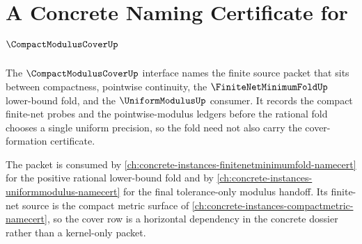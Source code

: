 \chapter{A Concrete Naming Certificate for $\CompactModulusCoverUp$}
\label{ch:concrete-instances-compactmoduluscover-namecert}

The $\CompactModulusCoverUp$ interface names the finite source packet that sits between compactness, pointwise continuity, the $\FiniteNetMinimumFoldUp$ lower-bound fold, and the $\UniformModulusUp$ consumer. It records the compact finite-net probes and the pointwise-modulus ledgers before the rational fold chooses a single uniform precision, so the fold need not also carry the cover-formation certificate.

The packet is consumed by \autoref{ch:concrete-instances-finitenetminimumfold-namecert} for the positive rational lower-bound fold and by \autoref{ch:concrete-instances-uniformmodulus-namecert} for the final tolerance-only modulus handoff. Its finite-net source is the compact metric surface of \autoref{ch:concrete-instances-compactmetric-namecert}, so the cover row is a horizontal dependency in the concrete dossier rather than a kernel-only packet.

